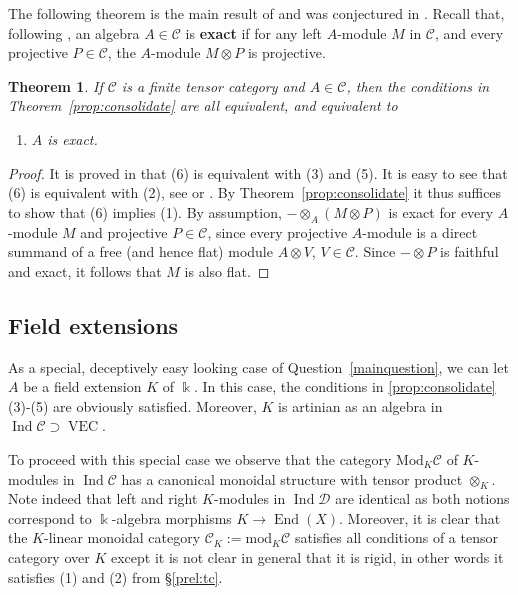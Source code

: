 \documentclass[11pt]{amsart}
\def\End{\operatorname{End}}
\def\Ind{\operatorname{Ind}}
\def\Cs{\mathscr{C}}
\def\Ds{\mathscr{D}}
\def\cC{\mathscr{C}}
\def\bk{\Bbbk}
\def\mod{\mathrm{ mod}}
\def\VEC{\operatorname{VEC}}
\def\Mod{\mathrm{Mod}}
\newtheorem{thm}{Theorem}[section]
\theoremstyle{definition}
\theoremstyle{remark}
\numberwithin{equation}{section}
\begin{document}
The following theorem is the main result of \cite{CSZ} and was conjectured in \cite{EO}. Recall that, following \cite{EGNO}, an algebra $A\in\cC$ is {\bf exact} if for any left $A$-module $M$ in $\cC$, and every projective $P\in\cC$, the $A$-module $M\otimes P$ is projective.
\begin{thm}\label{thm:CSZ}
    If $\cC$ is a finite tensor category and $A\in\cC$, then the conditions in Theorem~\ref{prop:consolidate} are all equivalent, and equivalent to 
    \begin{enumerate}
        \item[(6)] $A$ is exact.
    \end{enumerate}
\end{thm}
\begin{proof}
    It is proved in \cite[Theorem~7.1]{CSZ} that (6) is equivalent with (3) and (5). It is easy to see that (6) is equivalent with (2), see \cite[Theorem~7.10.1]{EGNO} or \cite[Proposition~A.2]{CSZ}. By Theorem~\ref{prop:consolidate} it thus suffices to show that (6) implies (1). By assumption, $-\otimes_A(M\otimes P)$ is exact for every $A$-module $M$  and projective $P\in\Cs$, since every projective $A$-module is a direct summand of a free (and hence flat) module $A\otimes V$, $V\in\cC$. Since $-\otimes P$ is faithful and exact, it follows that $M$ is also flat.
\end{proof}

\subsection{Field extensions}






As a special, deceptively easy looking case of Question~\ref{mainquestion}, we can let $A$ be a field extension $K$ of $\bk$. In this case, the conditions in \ref{prop:consolidate}(3)-(5) are obviously satisfied. Moreover, $K$ is artinian as an algebra in $\Ind\cC\supset\VEC$.

To proceed with this special case we observe that the category $\Mod_{K}\cC$ of $K$-modules in $\Ind\cC$ has a canonical monoidal structure with tensor product $\otimes_K$. Note indeed that left and right $K$-modules in $\Ind\Ds$ are identical as both notions correspond to $\bk$-algebra morphisms $K\to\End(X)$. Moreover, it is clear that the $K$-linear monoidal category $\cC_K:=\mod_K\cC$ satisfies all conditions of a tensor category over $K$ except it is not clear in general that it is rigid, in other words it satisfies (1) and (2) from \S\ref{prel:tc}.
\end{document}
